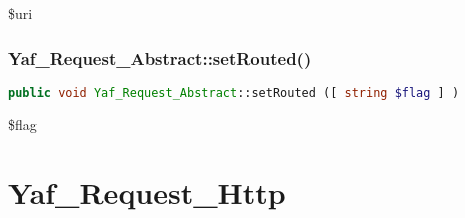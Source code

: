 \begin{compactitem}
\item \$uri
\end{compactitem}



\subsection{Yaf\_Request\_Abstract::setRouted()}

\begin{lstlisting}[language=PHP]
public void Yaf_Request_Abstract::setRouted ([ string $flag ] )
\end{lstlisting}

\begin{compactitem}
\item \$flag
\end{compactitem}

\chapter{Yaf\_Request\_Http}



